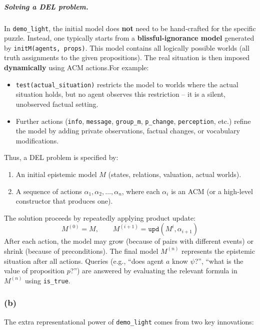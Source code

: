 \subparagraph{Solving a DEL problem.}
In \texttt{demo\_light}, the initial model does \textbf{not} 
need to be hand‑crafted for the specific puzzle. 
Instead, one typically starts from a 
\textbf{blissful‑ignorance model} generated 
by \texttt{initM(agents, props)}. 
This model contains all logically possible worlds 
(all truth assignments to the given propositions). 
The real situation is then imposed \textbf{dynamically} 
using ACM actions.For example:
\begin{itemize}
    \item \texttt{test(actual\_situation)} 
    restricts the model to worlds where the
    actual situation holds, but 
    no agent observes this restriction
     – it is a silent, unobserved factual setting.
    \item Further actions (\texttt{info}, 
    \texttt{message}, \texttt{group\_m}, 
    \texttt{p\_change}, \texttt{perception}, etc.) 
    refine the model by adding private observations,
    factual changes, or vocabulary modifications.
\end{itemize}
Thus, a DEL problem is specified by:
\begin{enumerate}
    \item An initial epistemic model $M$ 
    (states, relations, valuation, actual worlds).
    \item A sequence of actions $\alpha_1, \alpha_2, 
    \dots, \alpha_n$, where each $\alpha_i$ is an ACM 
    (or a high‑level constructor that produces one).
\end{enumerate}
The solution proceeds by repeatedly applying 
product update:
\[
M^{(0)} = M,\qquad M^{(i+1)} = \texttt{upd}(M^i, \alpha_{i+1})
\]
After each action, the model may grow 
(because of pairs with different events) 
or shrink (because of preconditions). 
The final model $M^{(n)}$ represents the 
epistemic situation after all actions. Queries 
(e.g., “does agent $a$ know $\psi$?”, 
“what is the value of proposition $p$?”) 
are answered by evaluating the relevant 
formula in $M^{(n)}$ using \texttt{is\_true}.

\subsubsection*{(b)}

The extra representational power of \texttt{demo\_light} 
comes from two key innovations:

